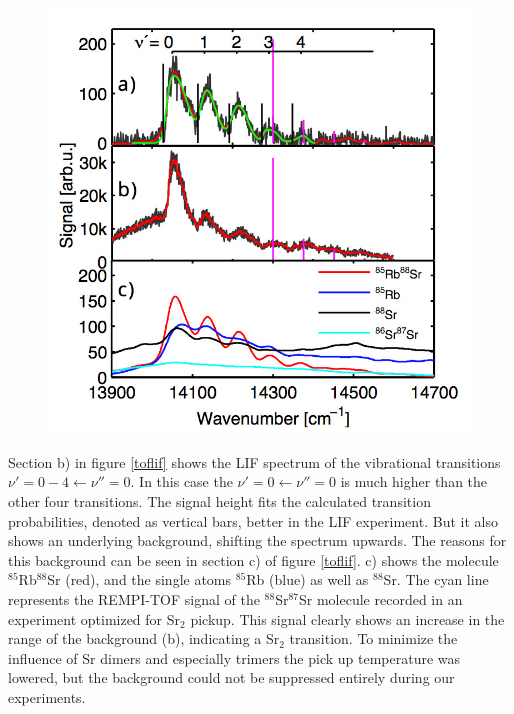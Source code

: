 \documentclass[parskip,12pt,headsepline,a4paper] {scrbook}
\begin{document}
\begin{figure}[ht]
\centerline{
\includegraphics[width=12cm]{./resultsRbSr/liftof.jpg}}
\end{figure}

Section b) in figure \ref{toflif} shows the LIF spectrum of the vibrational transitions $\nu'=0-4 \leftarrow \nu''=0$. In this case the $\nu'=0 \leftarrow \nu''=0$ is much higher than the other four transitions. The signal height fits the calculated transition probabilities, denoted as vertical bars, better in the LIF experiment. But it also shows an underlying background, shifting the spectrum upwards. The reasons for this background can be seen in section c) of figure \ref{toflif}. c) shows the molecule $^{85}$Rb$^{88}$Sr (red), and the single atoms $^{85}$Rb (blue) as well as $^{88}$Sr. The cyan line represents the REMPI-TOF signal of the $^{88}$Sr$^{87}$Sr molecule recorded in an experiment optimized for Sr$_2$ pickup. This signal clearly shows an increase in the range of the background (b), indicating a Sr$_2$ transition. To minimize the influence of Sr dimers and especially trimers the pick up temperature was lowered, but the background could not be suppressed entirely during our experiments.
\end{document}
